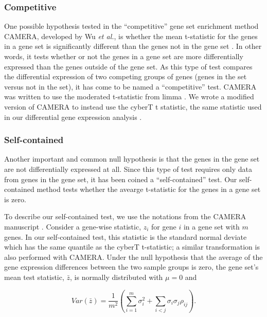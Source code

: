 \subsubsection{Competitive}

One possible hypothesis tested in the ``competitive'' gene set enrichment method
CAMERA, developed by Wu \emph{et al.}, is whether the mean t-statistic for the 
genes in a gene set is significantly different than the genes not in the 
gene set \cite{Wu:2012kp}. In other words, it tests whether or not the genes in a gene set are 
more differentially expressed than the genes outside of the gene set. As 
this type of test compares the differential expression of two competing 
groups of genes (genes in the set versus not in the set), it has come to 
be named a ``competitive'' test. CAMERA was written to use the moderated t-statistic 
from limma \cite{Smyth:2004gh}. We wrote a modified version of CAMERA to instead use
the cyberT t statistic, the same statistic used in our differential gene
expression analysis \cite{Baldi:2001ul}.

\subsubsection{Self-contained}

Another important and common null hypothesis is that the genes in the gene set are 
not differentially expressed at all. Since this type of test requires only data 
from genes in the gene set, it has been coined a ``self-contained'' test. 
Our self-contained method tests whether the avearge t-statistic for the genes 
in a gene set is zero.

To describe our self-contained test, we use the 
notations from the CAMERA manuscript \cite{Wu:2012kp}.
Consider a gene-wise statistic, $z_i$ for gene $i$ in
a gene set with $m$ genes. In our self-contained test, this statistic is the 
standard normal deviate which has the
same quantile as the cyberT t-statistic; a similar transformation is also 
performed with CAMERA. Under the null hypothesis that
the average of the gene expression differences between the two sample groups is zero, 
the gene set's mean test statistic, $\bar{z}$, is normally distributed with
$\mu{}=0$ and

\begin{equation}
Var( \bar{z} ) = \frac{1}{m^2} 
                 \left(   
                   \sum\limits_{i=1}^m \sigma{}_i^2 + 
                   \sum\limits_{i<j} \sigma{}_i \sigma{}_j \rho_{ij}
                 \right).
\end{equation}

